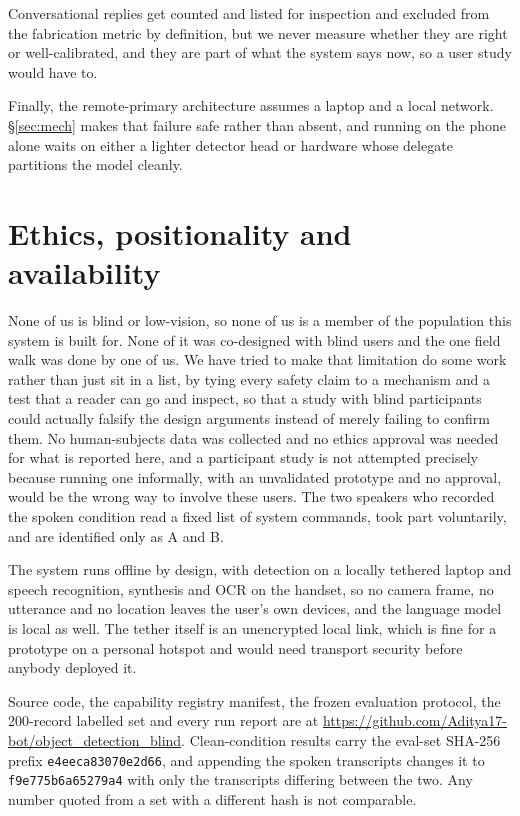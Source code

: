 \documentclass[sigconf,nonacm]{acmart}
\begin{document}
Conversational replies get counted and listed for inspection and excluded from
the fabrication metric by definition, but we never measure whether they are
right or well-calibrated, and they are part of what the system says now, so a
user study would have to.

Finally, the remote-primary architecture assumes a laptop and a local network.
\S\ref{sec:mech} makes that failure safe rather than absent, and running on the
phone alone waits on either a lighter detector head or hardware whose delegate
partitions the model cleanly.

\section{Ethics, positionality and availability}

None of us is blind or low-vision, so none of us is a member of the population
this system is built for. None of it was co-designed with blind users and the
one field walk was done by one of us. We have tried to make that limitation do
some work rather than just sit in a list, by tying every safety claim to a
mechanism and a test that a reader can go and inspect, so that a study with
blind participants could actually falsify the design arguments instead of merely
failing to confirm them. No human-subjects data was collected and no ethics
approval was needed for what is reported here, and a participant study is not
attempted precisely because running one informally, with an unvalidated
prototype and no approval, would be the wrong way to involve these users. The
two speakers who recorded the spoken condition read a fixed list of system
commands, took part voluntarily, and are identified only as A and B.

The system runs offline by design, with detection on a locally tethered laptop
and speech recognition, synthesis and OCR on the handset, so no camera frame, no
utterance and no location leaves the user's own devices, and the language model
is local as well. The tether itself is an unencrypted local link, which is fine
for a prototype on a personal hotspot and would need transport security before
anybody deployed it.

Source code, the capability registry manifest, the frozen evaluation protocol,
the 200-record labelled set and every run report are at
\url{https://github.com/Aditya17-bot/object_detection_blind}. Clean-condition
results carry the eval-set SHA-256 prefix \texttt{e4eeca83070e2d66}, and
appending the spoken transcripts changes it to \texttt{f9e775b6a65279a4} with
only the transcripts differing between the two. Any number quoted from a set
with a different hash is not comparable.
\end{document}
